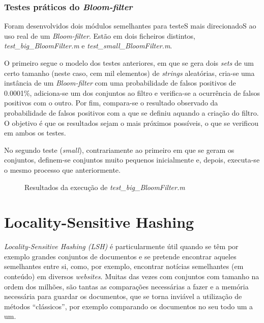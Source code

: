 \documentclass[a4paper,11pt,openright,oneside]{report}
\begin{document}
\subsection{Testes práticos do \textit{Bloom-filter}}
\label{subsec.testebloom}

Foram desenvolvidos dois módulos semelhantes para testeS mais direcionadoS ao uso real de um \textit{Bloom-filter}. Estão em dois ficheiros distintos, \textit{test\_big\_BloomFilter.m} e \textit{test\_small\_BloomFilter.m}.

O primeiro segue o modelo dos testes anteriores, em que se gera dois \textit{sets} de um certo tamanho (neste caso, cem mil elementos) de \textit{strings} aleatórias, cria-se uma instância de um \textit{Bloom-filter} com uma probabilidade de falsos positivos de 0.0001\%, adiciona-se um dos conjuntos ao filtro e verifica-se a ocurrência de falsos positivos com o outro. Por fim, compara-se o resultado observado da probabilidade de falsos positivos com a que se definiu aquando a criação do filtro. O objetivo é que os resultados sejam o mais próximos possíveis, o que se verificou em ambos os testes.

No segundo teste (\textit{small}), contrariamente ao primeiro em que se geram os conjuntos, definem-se conjuntos muito pequenos inicialmente e, depois, executa-se o mesmo processo que anteriormente.

\begin{figure}[ht]
\center
{}
\caption{Resultados da execução de \textit{test\_big\_BloomFilter.m}}
\label{fig:testbigbloom}
\end{figure}

\chapter{Locality-Sensitive Hashing}
\label{chap.lsh}

\textit{Locality-Sensitive Hashing (LSH)} é particularmente útil quando se têm por exemplo grandes conjuntos de documentos e se pretende encontrar aqueles semelhantes entre si, como, por exemplo, encontrar notícias semelhantes (em conteúdo) em diversos \textit{websites}. Muitas das vezes com conjuntos com tamanho na ordem dos milhões, são tantas as comparações necessárias a fazer e a memória necessária para guardar os documentos, que se torna inviável a utilização de métodos ``clássicos'', por exemplo comparando os documentos no seu todo um a um.
\end{document}
